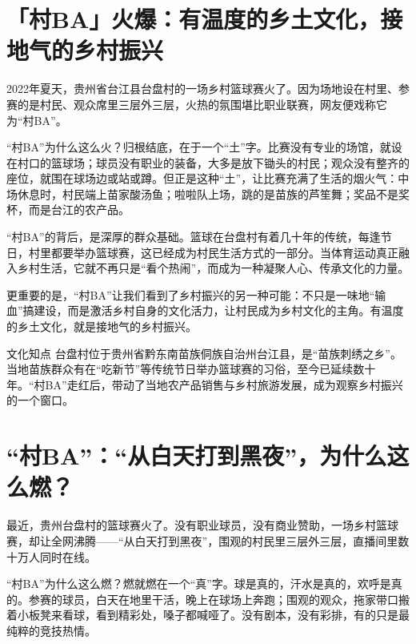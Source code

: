 
\section*{「村BA」火爆：有温度的乡土文化，接地气的乡村振兴}

2022年夏天，贵州省台江县台盘村的一场乡村篮球赛火了。因为场地设在村里、参赛的是村民、观众席里三层外三层，火热的氛围堪比职业联赛，网友便戏称它为“村BA”。

“村BA”为什么这么火？归根结底，在于一个“土”字。比赛没有专业的场馆，就设在村口的篮球场；球员没有职业的装备，大多是放下锄头的村民；观众没有整齐的座位，就围在球场边或站或蹲。但正是这种“土”，让比赛充满了生活的烟火气：中场休息时，村民端上苗家酸汤鱼；啦啦队上场，跳的是苗族的芦笙舞；奖品不是奖杯，而是台江的农产品。

“村BA”的背后，是深厚的群众基础。篮球在台盘村有着几十年的传统，每逢节日，村里都要举办篮球赛，这已经成为村民生活方式的一部分。当体育运动真正融入乡村生活，它就不再只是“看个热闹”，而成为一种凝聚人心、传承文化的力量。

更重要的是，“村BA”让我们看到了乡村振兴的另一种可能：不只是一味地“输血”搞建设，而是激活乡村自身的文化活力，让村民成为乡村文化的主角。有温度的乡土文化，就是接地气的乡村振兴。

\begin{quoteBox}{文化知点}
台盘村位于贵州省黔东南苗族侗族自治州台江县，是“苗族刺绣之乡”。当地苗族群众有在“吃新节”等传统节日举办篮球赛的习俗，至今已延续数十年。“村BA”走红后，带动了当地农产品销售与乡村旅游发展，成为观察乡村振兴的一个窗口。
\end{quoteBox}

\clearpage
\section*{“村BA”：“从白天打到黑夜”，为什么这么燃？}

最近，贵州台盘村的篮球赛火了。没有职业球员，没有商业赞助，一场乡村篮球赛，却让全网沸腾——“从白天打到黑夜”，围观的村民里三层外三层，直播间里数十万人同时在线。

“村BA”为什么这么燃？燃就燃在一个“真”字。球是真的，汗水是真的，欢呼是真的。参赛的球员，白天在地里干活，晚上在球场上奔跑；围观的观众，拖家带口搬着小板凳来看球，看到精彩处，嗓子都喊哑了。没有剧本，没有彩排，有的只是最纯粹的竞技热情。

